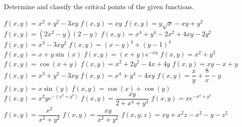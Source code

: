 \begin{Exercise} Determine and classify the critical points of the given functions.
	\begin{multicols}{2}
		\Question[difficulty=1] $f(x,y) = x^2 + y^2 - 3 x y$
		\Question[difficulty=1] $f(x,y) = x y $
		\Question[difficulty=1] $f(x,y) = y \sqrt{x} - x y  + y^2$
		\Question[difficulty=2] $f(x,y) = ( 2 x^2 - y ) ( 2 - y )$
		\Question[difficulty=2] $f(x,y) = x^4 + y^4 - 2 x^2 + 4 x y - 2 y^2 $
		\Question[difficulty=2] $f(x,y) = x^3 - 3 x y^2$
		\Question[difficulty=3] $f(x,y) = (x - y)^4 + (y - 1)^4$
		\Question[difficulty=2] $f(x,y) = x+y\sin(x)$ 
		\Question[difficulty=3] $f(x,y) = (x+y) e^{-xy}$ 
		\ifanalysis\Question[difficulty=2]\fi\ifcalculus\Question[difficulty=3]\fi $f(x,y) = x^2+y^2 $
		\Question[difficulty=2] $f(x,y) = \cos(x+y) $ 
        \Question[difficulty=1] $f(x,y) = x^2+2y^2-4x+4y$
        \Question[difficulty=1] $f(x,y) = xy-x+y$
        \Question[difficulty=1] $f(x,y) = x^3+y^3-3xy$
        \Question[difficulty=1] $f(x,y) = x^4+y^4-4xy$
        \ifanalysis\Question[difficulty=1]\fi\ifcalculus\Question[difficulty=2]\fi $f(x,y) = \dfrac{x}{y} + \dfrac{8}{x}-y$
        \Question[difficulty=1] $f(x,y) = x\sin(y)$
        \Question[difficulty=2] $f(x,y) = \cos(x)+\cos(y)$
        \Question[difficulty=3] $f(x,y) = x^2ye^{-(x^2+y^2)}$
        \Question[difficulty=3] $f(x,y) = \dfrac{xy}{2+x^4+y^4}$
        \Question[difficulty=3] $f(x,y) = xe^{-x^3+y^3}$
        \Question[difficulty=3] $f(x,y) = \dfrac{x^2}{x^2+y^2}$
        \Question[difficulty=3] $f(x,y) = \dfrac{xy}{x^2+y^2}$
        \Question[difficulty=2] $f(x,y,z) = xy+x^2z-x^2-y-z^2$
        \EndCurrentQuestion
\end{multicols}
\end{Exercise}

